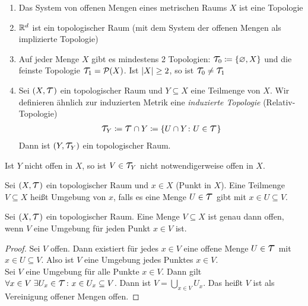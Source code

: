 \begin{beispiel}
    \theoremescape
    \begin{enumerate}
        \item Das System von offenen Mengen eines metrischen Raums $X$ ist eine Topologie
        \item $\mathbb{R}^d$ ist ein topologischer Raum (mit dem System der offenen Mengen als implizierte Topologie)
        \item Auf jeder Menge $X$ gibt es mindestens 2 Topologien: $\Tau_0 \coloneqq \set{\emptyset, X}$ und die feinste Topologie $\Tau_1 = \mathcal{P}\of{X}$. Ist $\left\lvert X\right\rvert \geq 2$, so ist $\Tau_0 \neq \Tau_1$
        \item Sei $\pair{X, \Tau}$ ein topologischer Raum und $Y\subseteq X$ eine Teilmenge von $X$. Wir definieren ähnlich zur induzierten Metrik eine \emph{induzierte Topologie} (Relativ-Topologie)
        \begin{align*}
            \Tau_{Y} \coloneqq \Tau \cap Y \coloneqq \set{U \cap Y \colon U\in \Tau}
        \end{align*}
        Dann ist $\pair{Y, \Tau_Y}$ ein topologischer Raum.
    \end{enumerate}
\end{beispiel}

\begin{bemerkung}
    Ist $Y$ nicht offen in $X$, so ist $V\in \Tau_Y$ nicht notwendigerweise offen in $X$.
\end{bemerkung}

\begin{definition}[Umgebung]
    Sei $\pair{X, \Tau}$ ein topologischer Raum und $x\in X$ (Punkt in $X$). Eine Teilmenge $V\subseteq X$ heißt Umgebung von $x$, falls es eine Menge $U\in\Tau$ gibt mit $x\in U \subseteq V$.
\end{definition}

\begin{satz} %
    Sei $\pair{X, \Tau}$ ein topologischer Raum. Eine Menge $V\subseteq X$ ist genau dann offen, wenn $V$ eine Umgebung für jeden Punkt $x\in V$ ist.
    \begin{proof}
        \anf{$\impl$} Sei $V$ offen. Dann existiert für jedes $x\in V$ eine offene Menge $U\in\Tau$ mit $x\in U\subseteq V$. Also ist $V$ eine Umgebung jedes Punktes $x\in V$.\\[.5\baselineskip]
        \anf{$\Leftarrow$} Sei $V$ eine Umgebung für alle Punkte $x\in V$. Dann gilt $\forall x\in V\ex U_x \in \Tau\colon x\in U_x \subseteq V$. Dann ist $V=\bigcup_{x\in V} U_x$. Das heißt $V$ ist als Vereinigung offener Mengen offen.
    \end{proof}
\end{satz}

